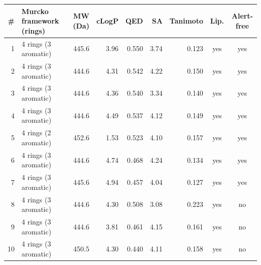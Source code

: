 \begin{tabular}{rlrrrrrcc}
\toprule
\# & Murcko framework (rings) & MW (Da) & cLogP & QED & SA & Tanimoto & Lip. & Alert-free \\
\midrule
1 & 4 rings (3 aromatic) & 445.6 & 3.96 & 0.550 & 3.74 & 0.123 & yes & yes \\
2 & 4 rings (3 aromatic) & 444.6 & 4.31 & 0.542 & 4.22 & 0.150 & yes & yes \\
3 & 4 rings (3 aromatic) & 444.6 & 4.36 & 0.540 & 3.34 & 0.140 & yes & yes \\
4 & 4 rings (3 aromatic) & 444.6 & 4.49 & 0.537 & 4.12 & 0.149 & yes & yes \\
5 & 4 rings (2 aromatic) & 452.6 & 1.53 & 0.523 & 4.10 & 0.157 & yes & yes \\
6 & 4 rings (3 aromatic) & 444.6 & 4.74 & 0.468 & 4.24 & 0.134 & yes & yes \\
7 & 4 rings (3 aromatic) & 445.6 & 4.94 & 0.457 & 4.04 & 0.127 & yes & yes \\
8 & 4 rings (3 aromatic) & 444.6 & 4.30 & 0.508 & 3.08 & 0.223 & yes & no \\
9 & 4 rings (3 aromatic) & 444.6 & 3.81 & 0.461 & 4.15 & 0.161 & yes & no \\
10 & 4 rings (3 aromatic) & 450.5 & 4.30 & 0.440 & 4.11 & 0.158 & yes & no \\
\bottomrule
\end{tabular}
